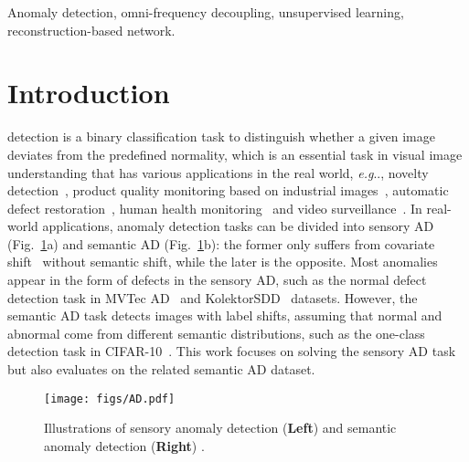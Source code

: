 \documentclass[lettersize,journal]{IEEEtran}
\makeatletter
\DeclareRobustCommand\onedot{\futurelet\@let@token\@onedot}
\def\@onedot{\ifx\@let@token.\else.\null\fi\xspace}
\def\eg{\emph{e.g}\onedot} \def\Eg{\emph{E.g}\onedot}
\makeatother
\begin{document}
\begin{IEEEkeywords}
Anomaly detection, omni-frequency decoupling, unsupervised learning, reconstruction-based network.
\end{IEEEkeywords}

\section{Introduction}\label{sec:introduction}
 detection is a binary classification task to distinguish whether a given image deviates from the predefined normality, which is an essential task in visual image understanding that has various applications in the real world, \eg, novelty detection~\cite{nilsback2008automated}, product quality monitoring based on industrial images~\cite{bergmann2019mvtec}, automatic defect restoration~\cite{wang2012archive}, human health monitoring~\cite{li2018thoracic} and video surveillance~\cite{liu2018classifier,sultani2018real,lv2021localizing,jardim2019domain}. In real-world applications, anomaly detection tasks can be divided into sensory AD (Fig.~\ref{fig:AD}a) and semantic AD (Fig.~\ref{fig:AD}b): the former only suffers from covariate shift~\cite{yang2021generalized} without semantic shift, while the later is the opposite. Most anomalies appear in the form of defects in the sensory AD, such as the normal defect detection task in MVTec AD~\cite{bergmann2019mvtec} and KolektorSDD~\cite{Tabernik2019JIM} datasets. However, the semantic AD task detects images with label shifts, assuming that normal and abnormal come from different semantic distributions, such as the one-class detection task in CIFAR-10~\cite{krizhevsky2009learning}. This work focuses on solving the sensory AD task but also evaluates on the related semantic AD dataset.
\begin{figure}[t]
    \centering
    \texttt{[image: figs/AD.pdf]}
    \caption{Illustrations of sensory anomaly detection (\textbf{Left}) and semantic anomaly detection (\textbf{Right}) .}
    \label{fig:AD}
\end{figure}
\end{document}
